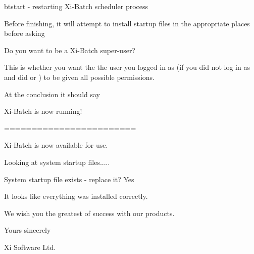 {\begin{expara}
btstart - restarting Xi-Batch scheduler process

\end{expara}

Before finishing, it will attempt to install startup files in the
appropriate places before asking

\begin{expara}

Do you want to be a Xi-Batch super-user?

\end{expara}

This is whether you want the the user you logged in as (if you did not
log in as  and did  or
) to be given all possible permissions.

At the conclusion it should say

\begin{expara}

Xi-Batch is now running!

========================

\bigskip

Xi-Batch is now available for use.

\bigskip

Looking at system startup files.....

System startup file exists - replace it? Yes

\bigskip

It looks like everything was installed correctly.

We wish you the greatest of success with our products.

\bigskip

Yours sincerely

\bigskip

Xi Software Ltd.

\end{expara}
}
